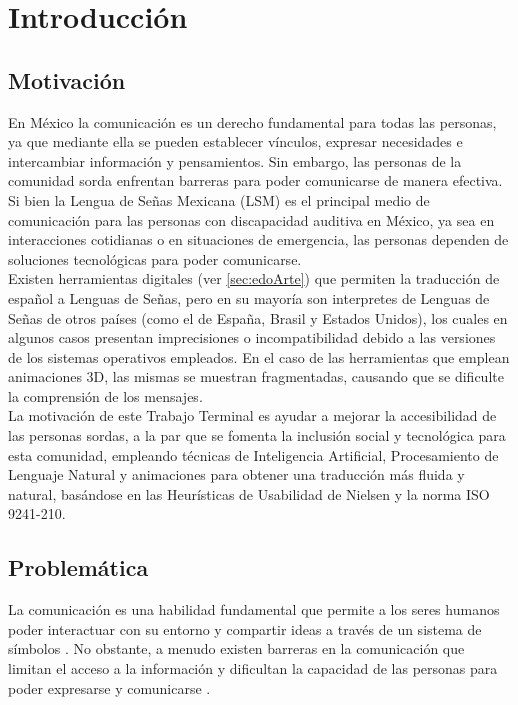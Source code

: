 \chapter{Introducción}
\label{sec:Intro}

\section{Motivación}
En México la comunicación es un derecho fundamental para todas las personas, ya que mediante ella se pueden establecer vínculos, expresar necesidades e intercambiar información y pensamientos. Sin embargo, las personas de la comunidad sorda enfrentan barreras para poder comunicarse de manera efectiva. \\

Si bien la Lengua de Señas Mexicana (LSM) es el principal medio de comunicación para las personas con discapacidad auditiva en México, ya sea en interacciones cotidianas o en situaciones de emergencia, las personas dependen de soluciones tecnológicas para poder comunicarse. \\

Existen herramientas digitales (ver \autoref{sec:edoArte}) que permiten la traducción de español a Lenguas de Señas, pero en su mayoría son interpretes de Lenguas de Señas de otros países (como el de España, Brasil y Estados Unidos), los cuales en algunos casos presentan imprecisiones o incompatibilidad debido a las versiones de los sistemas operativos empleados. En el caso de las herramientas que emplean animaciones 3D, las mismas se muestran fragmentadas, causando que se dificulte la comprensión de los mensajes.\\

La motivación de este Trabajo Terminal es ayudar a mejorar la accesibilidad de las personas sordas, a la par que se fomenta la inclusión social y tecnológica para esta comunidad, empleando técnicas de Inteligencia Artificial, Procesamiento de Lenguaje Natural y animaciones para obtener una traducción más fluida y natural, basándose en las Heurísticas de Usabilidad de Nielsen y la norma ISO 9241-210.\\


\newpage
\section{Problemática}
La comunicación es una habilidad fundamental que permite a los seres humanos poder interactuar con su entorno y compartir ideas a través de un sistema de símbolos \cite{ref1}. No obstante, a menudo existen barreras en la comunicación que limitan el acceso a la información y dificultan la capacidad de las personas para poder expresarse y comunicarse \cite{ref2}. \\


